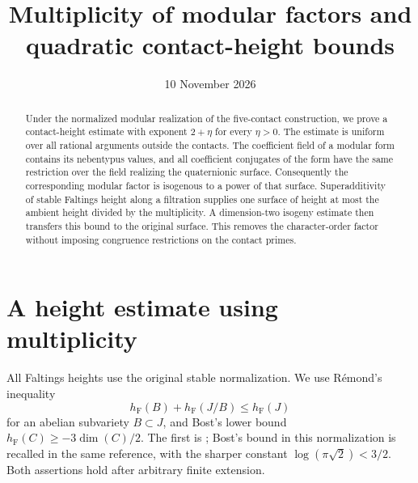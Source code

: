 \documentclass[11pt,a4paper]{article}
\title{Multiplicity of modular factors and quadratic contact-height bounds}
\author{}\date{10 November 2026}
\newcommand{\hF}{h_{\mathrm F}}
\begin{document}
\maketitle
\begin{abstract}
Under the normalized modular realization of the five-contact construction,
we prove a contact-height estimate with exponent \(2+\eta\) for every
\(\eta>0\). The estimate is uniform over all rational arguments outside
the contacts. The coefficient field of a modular form contains its
nebentypus values, and all coefficient conjugates of the form have the
same restriction over the field realizing the quaternionic surface.
Consequently the corresponding modular factor is isogenous to a power
of that surface. Superadditivity of stable Faltings height along a
filtration supplies one surface of height at most the ambient height
divided by the multiplicity. A dimension-two isogeny estimate then
transfers this bound to the original surface. This removes the
character-order factor without imposing congruence restrictions on
the contact primes.
\end{abstract}

\section{A height estimate using multiplicity}

All Faltings heights use the original stable normalization. We use
R\'emond's inequality
\begin{equation}\label{eq:remond}
 \hF(B)+\hF(J/B)\le\hF(J)
\end{equation}
for an abelian subvariety \(B\subset J\), and Bost's lower bound
\(\hF(C)\ge-3\dim(C)/2\). The first is
\cite[Corollary~1.2 and the paragraph after Corollary~1.3]{Remond};
Bost's bound in this normalization is recalled in the same reference,
with the sharper constant $\log(\pi\sqrt2)<3/2$. Both assertions hold
after arbitrary finite extension.
\end{document}
